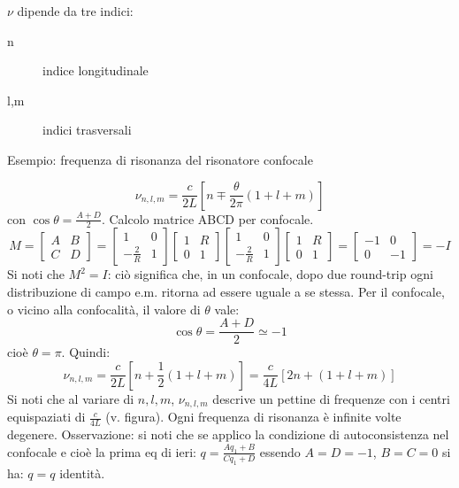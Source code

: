 \begin{enumerate}
$\nu$ dipende da tre indici:
\begin{description}
\item [n] indice longitudinale
\item [l,m] indici trasversali
\end{description}

\end{enumerate}

Esempio: frequenza di risonanza del risonatore confocale

\begin{equation*}
\nu_{n,l,m} = \frac{c}{2L} \left[n \mp \frac{\theta}{2\pi}(1+l+m)\right]
\end{equation*}
con $\cos\theta = \frac{A+D}{2}$.
Calcolo matrice ABCD per confocale.
\begin{equation*}
M = \begin{bmatrix}
A	&	B\\
C	&	D
\end{bmatrix}
=\begin{bmatrix}
1	&	0\\
-\frac{2}{R}	&	1
\end{bmatrix}\begin{bmatrix}
1	&	R\\
0	&	1
\end{bmatrix}\begin{bmatrix}
1	&	0\\
-\frac{2}{R}	&	1
\end{bmatrix}\begin{bmatrix}
1	&	R\\
0	&	1
\end{bmatrix}=\begin{bmatrix}
-1	&	0\\
0	&	-1
\end{bmatrix}=-I
\end{equation*}
Si noti che $M^2 = I$: ciò significa che, in un confocale, dopo due round-trip ogni distribuzione di campo e.m. ritorna ad essere uguale a se stessa.
Per il confocale, o vicino alla confocalità, il valore di $\theta$ vale:
\begin{equation*}
\cos\theta = \frac{A+D}{2}\simeq -1
\end{equation*}
cioè $\theta=\pi$. Quindi:
\begin{equation*}
\nu_{n,l,m} = \frac{c}{2L} \left[n + \frac{1}{2}(1+l+m)\right] = \frac{c}{4L} \left[2n + (1+l+m)\right]
\end{equation*}
Si noti che al variare di $n,l,m$, $\nu_{n,l,m}$ descrive un pettine di frequenze con i centri equispaziati di $\frac{c}{4L}$ (v. figura). Ogni frequenza di risonanza è infinite volte degenere.
Osservazione: si noti che se applico la condizione di autoconsistenza nel confocale e cioè la prima eq di ieri: $q = \frac{Aq_1 + B}{Cq_1 + D}$
essendo $A=D=-1$, $B=C=0$ si ha: $q=q$ identità.

